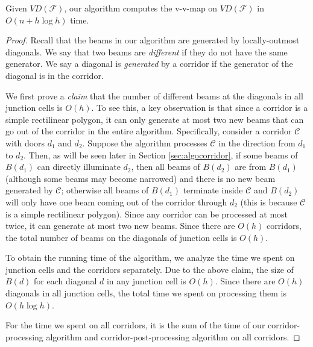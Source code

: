 \documentclass[english,runningheads,11pt]{llncs-revised}
\def\calF{\mathcal{F}}
\def\calC{\mathcal{C}}
\newcommand{\vtd}{\mbox{$V\!D$}}
\begin{document}
\begin{lemma}
Given $\vtd(\calF)$, our algorithm computes the v-v-map on $\vtd(\calF)$ in $O(n+h\log h)$ time.
\end{lemma}
\begin{proof}
Recall that the beams in our algorithm are generated by
locally-outmost diagonals. We say that two beams are {\em different}
if they do not have the same generator. We say a diagonal is {\em generated}
by a corridor if the generator of the
diagonal is in the corridor.

We first prove a {\em claim} that the
number of different beams at the diagonals in all junction cells is $O(h)$. To see this, a key
observation is that since a corridor is a simple rectilinear polygon,
it can only generate at most two new beams that can
go out of the corridor in the entire algorithm. Specifically, consider a
corridor $\calC$ with doors $d_1$ and $d_2$. Suppose the algorithm
processes $\calC$ in the direction from $d_1$ to $d_2$. Then, as will be seen later in Section \ref{sec:algocorridor}, if some beams of $B(d_1)$ can directly illuminate $d_2$, then all beams of
$B(d_2)$ are from $B(d_1)$ (although some beams may become narrowed) and there is no new beam generated by $\calC$;
otherwise all beams of $B(d_1)$ terminate inside $\calC$ and
$B(d_2)$ will only have one beam coming out of the corridor through $d_2$ (this is because $\calC$ is a simple rectilinear polygon).
Since any corridor can be processed at most twice,
it can generate at most two new beams.
Since there are $O(h)$ corridors, the total number of beams on
the diagonals of junction cells is $O(h)$.

To obtain the running time of the algorithm, we analyze the
time we spent on junction cells and the corridors separately. Due to the above
claim, the size of $B(d)$ for each diagonal $d$ in any junction cell
is $O(h)$. Since there are $O(h)$ diagonals in all junction cells,
the total time we spent on processing them is $O(h\log h)$.

For the time we spent on all corridors, it is the sum of the time
of our corridor-processing algorithm and corridor-post-processing
algorithm on all corridors.


\end{proof}
\end{document}
